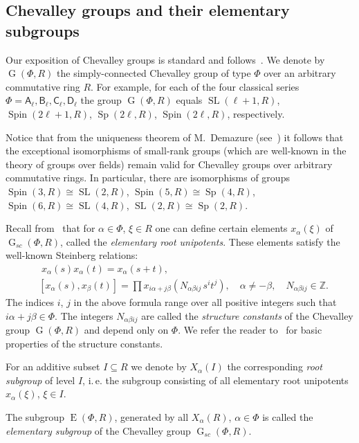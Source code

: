 \documentclass[oneside, 12pt]{amsart}
\theoremstyle{plain}
\numberwithin{equation}{section}
\numberwithin{lemma}{section}
\theoremstyle{definition}
\theoremstyle{remark}
\DeclareMathOperator{\G}{G}
\DeclareMathOperator{\SL}{SL}
\DeclareMathOperator{\Sp}{Sp}
\DeclareMathOperator{\E}{E}
\DeclareMathOperator{\Spin}{Spin}
\newcommand{\rA}{\mathsf{A}}
\newcommand{\rB}{\mathsf{B}}
\newcommand{\rC}{\mathsf{C}}
\newcommand{\rD}{\mathsf{D}}
\begin{document}
\subsection{Chevalley groups and their elementary subgroups} \label{sec:elementary}
Our exposition of Chevalley groups is standard and follows~\cite{Ta, S, St78, VP, Va86}.
We denote by $\G(\Phi, R)$ the simply-connected Chevalley group of type $\Phi$ over an arbitrary commutative ring $R$. For example, for each of the four classical series $\Phi=\rA_\ell, \rB_\ell, \rC_\ell, \rD_\ell$
the group $\G(\Phi, R)$ equals $\SL(\ell+1, R)$, $\Spin(2\ell+1, R)$, $\Sp(2\ell, R)$, $\Spin(2\ell, R)$, respectively. 

Notice that from the uniqueness theorem of M.~Demazure (see~\cite[Corollaire~5.2]{SGA3}) 
it follows that the exceptional isomorphisms of small-rank groups (which are well-known in the theory of groups over fields) remain valid for Chevalley groups over arbitrary commutative rings.
In particular, there are isomorphisms of groups $\Spin(3, R)\cong\SL(2, R)$, $\Spin(5, R)\cong \Sp(4, R)$, $\Spin(6, R)\cong\SL(4, R)$, $\SL(2, R)\cong \Sp(2, R)$.  

Recall from~\cite{St78, VP} that for $\alpha\in \Phi$, $\xi\in R$ one can define certain elements $x_{\alpha}(\xi)$ of $\G_{sc}(\Phi, R)$, called the {\it elementary root unipotents}.
These elements satisfy the well-known Steinberg relations:
\begin{align}
& \phantom{[}
x_\alpha(s) x_\alpha(t) = x_\alpha(s+t), \label{rel:add}\\
& [x_\alpha(s), x_\beta(t)] = \prod x_{i\alpha + j\beta}\left(N_{\alpha\beta ij}\, s^i t^j\right), \quad \alpha\neq-\beta, \quad N_{\alpha\beta ij}\in\mathbb{Z}. \label{rel:CCF}
\end{align} 
The indices $i$, $j$ in the above formula range over all positive integers such that $i\alpha + j\beta\in\Phi$.
The integers $N_{\alpha\beta ij}$ are called the \emph{structure constants} of the Chevalley group $\G(\Phi, R)$ and depend only on $\Phi$.
We refer the reader to~\cite[\S14]{VP} for basic properties of the structure constants.

For an additive subset $I\subseteq R$ we denote by $X_\alpha(I)$ the corresponding \emph{root subgroup} of level $I$, i.\,e. the subgroup consisting of all elementary root unipotents $x_\alpha(\xi)$, $\xi\in I$.

The subgroup $\E(\Phi, R)$, generated by all $X_\alpha(R)$, $\alpha\in\Phi$ is called the {\it elementary subgroup} of the Chevalley group $\G_{sc}(\Phi, R)$.
\end{document}
